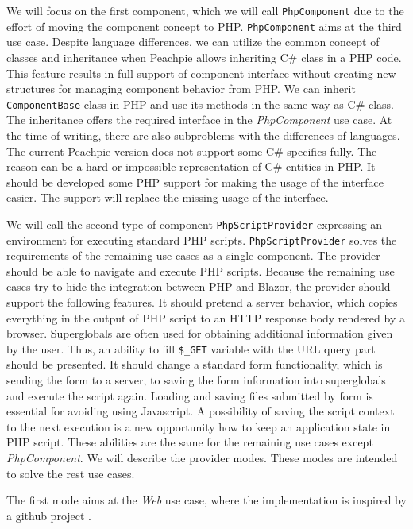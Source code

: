 \par
We will focus on the first component, which we will call \texttt{PhpComponent} due to the effort of moving the component concept to PHP.
\texttt{PhpComponent} aims at the third use case.
Despite language differences, we can utilize the common concept of classes and inheritance when Peachpie allows inheriting C\# class in a PHP code.
This feature results in full support of component interface without creating new structures for managing component behavior from PHP.
We can inherit \texttt{ComponentBase} class in PHP and use its methods in the same way as C\# class.
The inheritance offers the required interface in the \textit{PhpComponent} use case.
At the time of writing, there are also subproblems with the differences of languages.
The current Peachpie version does not support some C\# specifics fully.
The reason can be a hard or impossible representation of C\# entities in PHP.
It should be developed some PHP support for making the usage of the interface easier.
The support will replace the missing usage of the interface.
\par
We will call the second type of component \texttt{PhpScriptProvider} expressing an environment for executing standard PHP scripts.
\texttt{PhpScriptProvider} solves the requirements of the remaining use cases as a single component.
The provider should be able to navigate and execute PHP scripts.
Because the remaining use cases try to hide the integration between PHP and Blazor, the provider should support the following features.
It should pretend a server behavior, which copies everything in the output of PHP script to an HTTP response body rendered by a browser.
Superglobals are often used for obtaining additional information given by the user.
Thus, an ability to fill \texttt{\$\_GET} variable with the URL query part should be presented.
It should change a standard form functionality, which is sending the form to a server, to saving the form information into superglobals and execute the script again.
Loading and saving files submitted by form is essential for avoiding using Javascript.
A possibility of saving the script context to the next execution is a new opportunity how to keep an application state in PHP script.
These abilities are the same for the remaining use cases except \textit{PhpComponent}.
We will describe the provider modes.
These modes are intended to solve the rest use cases. 
\par
The first mode aims at the \textit{Web} use case, where the implementation is inspired by a github project .
